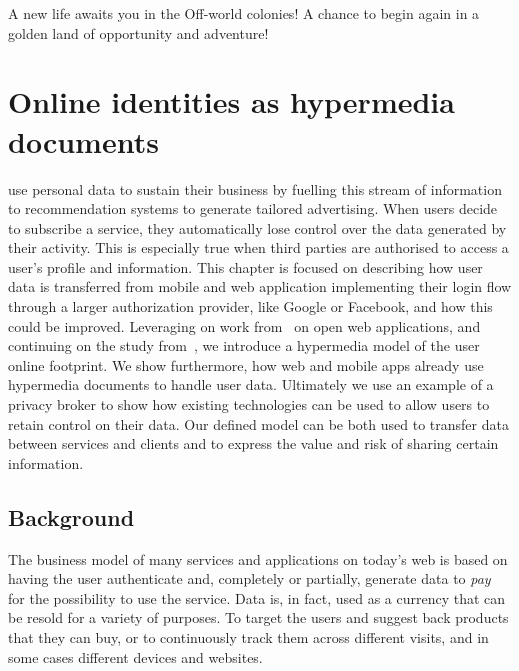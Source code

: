 \begin{savequote}[75mm]
A new life awaits you in the Off-world colonies! A chance to begin again in a golden land of opportunity and adventure!
\end{savequote}

\chapter{Online identities as hypermedia documents}

 use personal data to sustain their business by fuelling this stream of information to recommendation systems to generate tailored advertising. When users decide to subscribe a service, they automatically lose control over the data generated by their activity. This is especially true when third parties are authorised to access a user's profile and information. 
This chapter is focused on describing how user data is transferred from mobile and web application implementing their login flow through a larger authorization provider, like Google or Facebook, and how this could be improved. Leveraging on work from~\cite{puglisi2015restful} on open web applications, and continuing on the study from~\cite{puglisi2015potential}, we introduce a hypermedia model of the user online footprint. We show furthermore, how web and mobile apps already use hypermedia documents to handle user data. Ultimately we use an example of a privacy broker to show how existing technologies can be used to allow users to retain control on their data. Our defined model can be both used to transfer data between services and clients and to express the value and risk of sharing certain information.

\section{Background}

The business model of many services and applications on today's web is based on having the user authenticate and, completely or partially, generate data to \emph{pay} for the possibility to use the service. Data is, in fact, used as a currency that can be resold for a variety of purposes. To target the users and suggest back products that they can buy, or to continuously track them across different visits, and in some cases different devices and websites.

